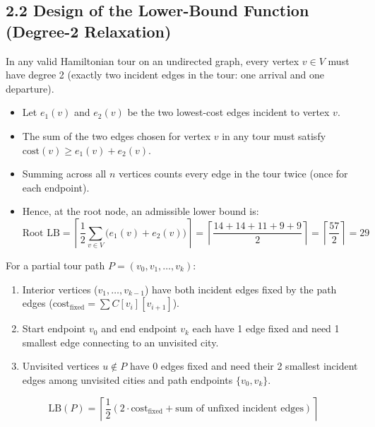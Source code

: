 \documentclass[12pt]{article}
\begin{document}
\subsection*{2.2 Design of the Lower-Bound Function (Degree-2 Relaxation)}
In any valid Hamiltonian tour on an undirected graph, every vertex $v \in V$ must have degree 2 (exactly two incident edges in the tour: one arrival and one departure).
\begin{itemize}
    \item Let $e_1(v)$ and $e_2(v)$ be the two lowest-cost edges incident to vertex $v$.
    \item The sum of the two edges chosen for vertex $v$ in any tour must satisfy $\text{cost}(v) \ge e_1(v) + e_2(v)$.
    \item Summing across all $n$ vertices counts every edge in the tour twice (once for each endpoint).
    \item Hence, at the root node, an admissible lower bound is:
    \[
    \text{Root LB} = \left\lceil \frac{1}{2} \sum_{v \in V} \big(e_1(v) + e_2(v)\big) \right\rceil = \left\lceil \frac{14 + 14 + 11 + 9 + 9}{2} \right\rceil = \left\lceil \frac{57}{2} \right\rceil = 29
    \]
\end{itemize}
For a partial tour path $P = (v_0, v_1, \dots, v_k)$:
\begin{enumerate}
    \item Interior vertices ($v_1, \dots, v_{k-1}$) have both incident edges fixed by the path edges ($\text{cost}_{\text{fixed}} = \sum C[v_i][v_{i+1}]$).
    \item Start endpoint $v_0$ and end endpoint $v_k$ each have 1 edge fixed and need 1 smallest edge connecting to an unvisited city.
    \item Unvisited vertices $u \notin P$ have 0 edges fixed and need their 2 smallest incident edges among unvisited cities and path endpoints $\{v_0, v_k\}$.
\end{enumerate}
\[
\text{LB}(P) = \left\lceil \frac{1}{2} \left( 2 \cdot \text{cost}_{\text{fixed}} + \text{sum of unfixed incident edges} \right) \right\rceil
\]
\end{document}
